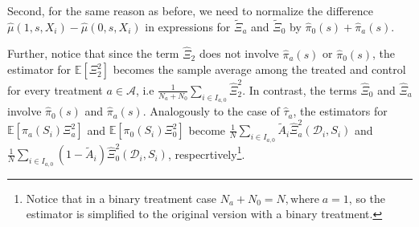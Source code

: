 \documentclass{article}
\begin{document}

Second, for the same reason as before, we need to normalize the difference $\hat{\mu}(1,s,X_i) - \hat{\mu}(0,s,X_i)$ in expressions for $\tilde{\Xi}_{a}$ and $\tilde{\Xi}_{0}$ by $\hat{\pi}_0(s) + \hat{\pi}_a(s)$.

Further, notice that since the term $\hat{\Xi}_2$ does not involve $\hat{\pi}_a(s)$ or $\hat{\pi}_0(s)$, the estimator for $\mathbb E[\Xi^2_2]$ becomes the sample average among the treated and control for every treatment $a \in \mathcal A$, i.e $\frac{1}{N_a + N_0} \sum_{i \in I_{a,0}} \hat{\Xi}^2_2$. In contrast, the terms $\hat{\Xi}_0$ and $\hat{\Xi}_a$ involve $\hat{\pi}_{0}(s)$ and $\hat{\pi}_{a}(s)$. Analogously to the case of $\hat{\tau}_a$, the estimators for $\mathbb E[\pi_a(S_i)\Xi^2_a]$ and $\mathbb E[\pi_0(S_i)\Xi^2_0]$ become $\frac{1}{N}\sum_{i \in I_{a,0}} \tilde{A}_i\hat{\Xi}_a^2(\mathcal D_i, S_i)$ and $\frac{1}{N}\sum_{i \in I_{a,0}} (1-\tilde{A}_i)\hat{\Xi}_0^2(\mathcal D_i, S_i)$, respecrtively\footnote{Notice that in a binary treatment case $N_a + N_0 = N, \text{where} \; a = 1$, so the estimator is simplified to the original version with a binary treatment.}.
\end{document}
